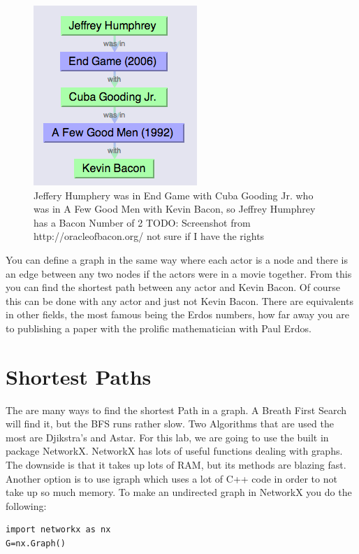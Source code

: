 \begin{figure}[H]
\includegraphics[scale = .6]{Example}
\caption{Jeffery Humphery was in End Game with Cuba Gooding Jr. who was in A Few Good Men with Kevin Bacon, so Jeffrey Humphrey has a Bacon Number of 2 TODO: Screenshot from http://oracleofbacon.org/ not sure if I have the rights}
\end{figure}

You can define a graph in the same way where each actor is a node and there is an edge between any two nodes if the actors were in a movie together. From this you can find the shortest path between any actor and Kevin Bacon. Of course this can be done with any actor and just not Kevin Bacon. There are equivalents in other fields, the most famous being the Erdos numbers, how far away you are to publishing a paper with the prolific mathematician with Paul Erdos.

\section*{Shortest Paths}

The are many ways to find the shortest Path in a graph. A Breath First Search will find it, but the BFS runs rather slow. Two Algorithms that are used the most are Djikstra's and Astar. For this lab, we are going to use the built in package NetworkX. NetworkX has lots of useful functions dealing with graphs. The downside is that it takes up lots of RAM, but its methods are blazing fast. Another option is to use igraph which uses a lot of C++ code in order to not take up so much memory.
 To make an undirected graph in NetworkX you do the following:

\begin{lstlisting}
import networkx as nx
G=nx.Graph()
\end{lstlisting}

